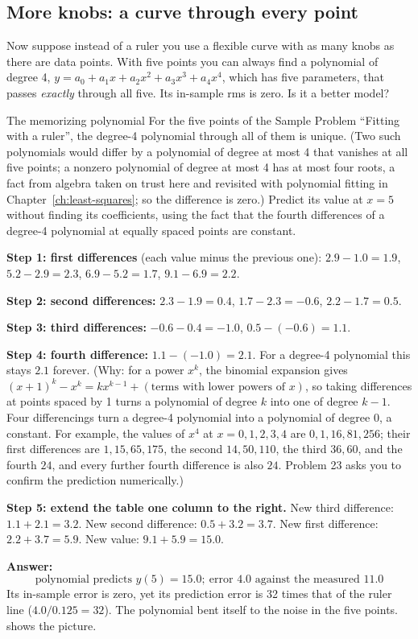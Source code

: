 \subsection{More knobs: a curve through every point}

Now suppose instead of a ruler you use a flexible curve with as many knobs as there are data points. With five points you can always find a polynomial of degree 4, $y = a_0 + a_1x + a_2x^2 + a_3x^3 + a_4x^4$, which has five parameters, that passes \emph{exactly} through all five. Its in-sample rms is zero. Is it a better model?

\begin{sample}{The memorizing polynomial}
For the five points of the Sample Problem ``Fitting with a ruler'', the degree-4 polynomial through all of them is unique. (Two such polynomials would differ by a polynomial of degree at most 4 that vanishes at all five points; a nonzero polynomial of degree at most 4 has at most four roots, a fact from algebra taken on trust here and revisited with polynomial fitting in Chapter~\ref{ch:least-squares}; so the difference is zero.) Predict its value at $x = 5$ without finding its coefficients, using the fact that the fourth differences of a degree-4 polynomial at equally spaced points are constant.

\textbf{Step 1: first differences} (each value minus the previous one): $2.9-1.0 = 1.9$, $5.2 - 2.9 = 2.3$, $6.9 - 5.2 = 1.7$, $9.1 - 6.9 = 2.2$.

\textbf{Step 2: second differences:} $2.3 - 1.9 = 0.4$, $1.7 - 2.3 = -0.6$, $2.2 - 1.7 = 0.5$.

\textbf{Step 3: third differences:} $-0.6 - 0.4 = -1.0$, $0.5 - (-0.6) = 1.1$.

\textbf{Step 4: fourth difference:} $1.1 - (-1.0) = 2.1$. For a degree-4 polynomial this stays $2.1$ forever. (Why: for a power $x^k$, the binomial expansion gives $(x+1)^k - x^k = k x^{k-1} + (\text{terms with lower powers of } x)$, so taking differences at points spaced by 1 turns a polynomial of degree $k$ into one of degree $k-1$. Four differencings turn a degree-4 polynomial into a polynomial of degree 0, a constant. For example, the values of $x^4$ at $x = 0,1,2,3,4$ are $0, 1, 16, 81, 256$; their first differences are $1, 15, 65, 175$, the second $14, 50, 110$, the third $36, 60$, and the fourth $24$, and every further fourth difference is also $24$. Problem 23 asks you to confirm the prediction numerically.)

\textbf{Step 5: extend the table one column to the right.} New third difference: $1.1 + 2.1 = 3.2$. New second difference: $0.5 + 3.2 = 3.7$. New first difference: $2.2 + 3.7 = 5.9$. New value: $9.1 + 5.9 = 15.0$.

\textbf{Answer:}
\[
\boxed{\text{polynomial predicts } y(5) = 15.0;\ \text{error } 4.0 \text{ against the measured } 11.0}
\]
Its in-sample error is zero, yet its prediction error is 32 times that of the ruler line ($4.0/0.125 = 32$). The polynomial bent itself to the noise in the five points.  shows the picture.
\end{sample}

